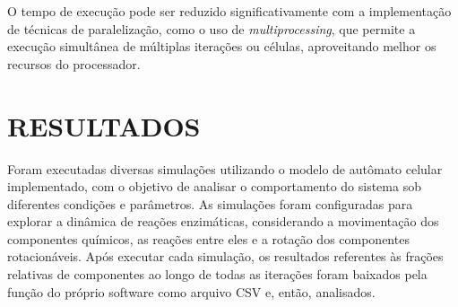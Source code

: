 \documentclass[12pt,oneside]{report}
\begin{document}
O tempo de execução pode ser reduzido significativamente com a implementação de técnicas de paralelização, como o uso de \textit{multiprocessing}, que permite a execução simultânea de múltiplas iterações ou células, aproveitando melhor os recursos do processador.




\chapter{RESULTADOS}

Foram executadas diversas simulações utilizando o modelo de autômato celular implementado, com o objetivo de analisar o comportamento do sistema sob diferentes condições e parâmetros. As simulações foram configuradas para explorar a dinâmica de reações enzimáticas, considerando a movimentação dos componentes químicos, as reações entre eles e a rotação dos componentes rotacionáveis. Após executar cada simulação, os resultados referentes às frações relativas de componentes ao longo de todas as iterações foram baixados pela função do próprio software como arquivo CSV e, então, analisados.
\end{document}
